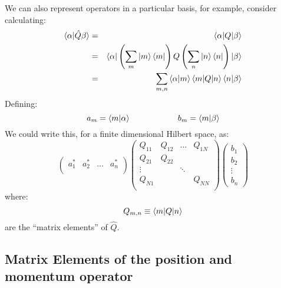\documentclass[12pt]{book}
\begin{document}
We can also represent operators in a particular basis, for example, consider calculating:
\begin{eqnarray*}
 \braket{\alpha|\hat{Q}\beta} &=& \braket{\alpha|Q|\beta}\\
 &=& \braket{\alpha|\left( \sum_m \ket{m}\bra{m} \right) Q \left( \sum_n \ket{n}\bra{n} \right) |\beta}\\
 &=& \sum_{m,n} \braket{\alpha|m} \braket{m | Q | n}  \braket{n|\beta}\\
\end{eqnarray*}
Defining:
$$a_m = \braket{m|\alpha} \hspace{2cm} b_m = \braket{m|\beta}$$
We could write this, for a finite dimensional Hilbert space, as:
$$
\begin{pmatrix}
a_{1}^* & a_{2}^* & \ldots & a_{n}^*\\
\end{pmatrix}
\begin{pmatrix}
           Q_{11} & Q_{12} & \ldots & Q_{1N} \\
           Q_{21} & Q_{22} &        &        \\
           \vdots &        & \ddots &        \\
           Q_{N1} &        &        & Q_{NN} \\    
\end{pmatrix}
\begin{pmatrix}
           b_{1} \\
           b_{2} \\
           \vdots \\
           b_{n}
\end{pmatrix}
$$
where:
$$Q_{m,n} \equiv \braket{m|Q|n}$$
are the ``matrix elements'' of $\hat{Q}$.

\subsection{Matrix Elements of the position and momentum operator}
\end{document}
